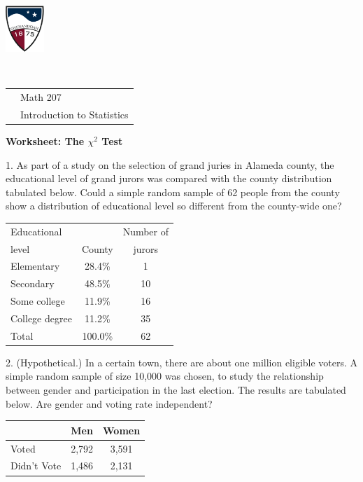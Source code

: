 \documentclass[10pt]{article}
\newcommand{\Z}{\hphantom{0}}
\begin{document}
\pagestyle{empty}
\lstset{language=R, showspaces=false, showstringspaces=false}
\href{http://www.su.edu}{\includegraphics[height=1.75cm]{sulogo.eps}}
\vspace{-1.79cm}

{{\ }\hfill\small
\begin{tabular}{cl}
& Math 207\\
& Introduction to Statistics\\
\end{tabular}
}
\setlength{\baselineskip}{1.05\baselineskip}
\medskip

\begin{center}
\textbf{\large  Worksheet:  The $\chi^2$ Test}
\end{center}
\smallskip


1. As part of a study on the selection of grand juries in Alameda county, the 
educational level of grand jurors was compared with the county distribution
tabulated below.  Could a simple random sample of 62 people from 
the county show a distribution of educational level so different from the 
county-wide one?

\begin{tabular}{|lcc|}\hline
Educational    &        & Number of\vphantom{\Large Y}\\
level          & County & jurors\\\hline
Elementary     & \Z28.4\% & \Z1\\
Secondary      & \Z48.5\% & 10\\
Some college   & \Z11.9\% & 16\\
College degree & \Z11.2\% & 35\\\hline
Total &        100.0\%  & 62\\\hline
\end{tabular}
\vspace{1in}

2. (Hypothetical.) In a certain town, there are about one million eligible voters.  A
simple random sample of size 10,000 was chosen, to study the relationship 
between gender and participation in the last election.  The results are tabulated below.
Are gender and voting rate independent?

\begin{tabular}{|lcc|}\hline
            & Men & Women\vphantom{\Large Y}\\\hline
Voted       & 2,792 & 3,591\\
Didn't Vote & 1,486 & 2,131\\\hline
\end{tabular}
\end{document}
